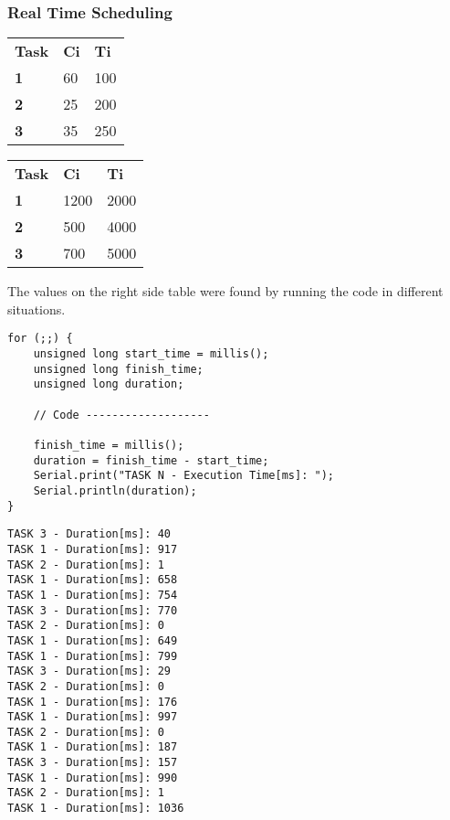 \documentclass[11pt]{article}
\begin{document}
\subsubsection{Real Time Scheduling}

\begin{table}[!htb]
    \caption{Theoretical values (left) and implemented values (right) in \textit{ms}:}
    \begin{minipage}{0.75\linewidth}
		\begin{table}[H]
		\begin{tabular}{lll}
		\textbf{Task} & \textbf{Ci} & \textbf{Ti} \\
		\textbf{1}    & 60         & 100           \\
		\textbf{2}    & 25         & 200           \\
		\textbf{3}    & 35         & 250          
		\end{tabular}
		\end{table}

    \end{minipage}%
    \begin{minipage}{.5\linewidth}
		\begin{table}[H]
		\begin{tabular}{lll}
		\textbf{Task} & \textbf{Ci} & \textbf{Ti} \\
		\textbf{1}    & 1200         & 2000           \\
		\textbf{2}    & 500         & 4000           \\
		\textbf{3}    & 700         & 5000          
		\end{tabular}
		\end{table}

    \end{minipage} 
\end{table}

The values on the right side table were found by running the code in different situations.

\begin{verbatim}
for (;;) {
    unsigned long start_time = millis();
    unsigned long finish_time;
    unsigned long duration;

    // Code -------------------

    finish_time = millis();      
    duration = finish_time - start_time;
    Serial.print("TASK N - Execution Time[ms]: ");
    Serial.println(duration); 
}
\end{verbatim}

\begin{verbatim}
TASK 3 - Duration[ms]: 40
TASK 1 - Duration[ms]: 917
TASK 2 - Duration[ms]: 1
TASK 1 - Duration[ms]: 658
TASK 1 - Duration[ms]: 754
TASK 3 - Duration[ms]: 770
TASK 2 - Duration[ms]: 0
TASK 1 - Duration[ms]: 649
TASK 1 - Duration[ms]: 799
TASK 3 - Duration[ms]: 29
TASK 2 - Duration[ms]: 0
TASK 1 - Duration[ms]: 176
TASK 1 - Duration[ms]: 997
TASK 2 - Duration[ms]: 0
TASK 1 - Duration[ms]: 187
TASK 3 - Duration[ms]: 157
TASK 1 - Duration[ms]: 990
TASK 2 - Duration[ms]: 1
TASK 1 - Duration[ms]: 1036
\end{verbatim}
\end{document}
